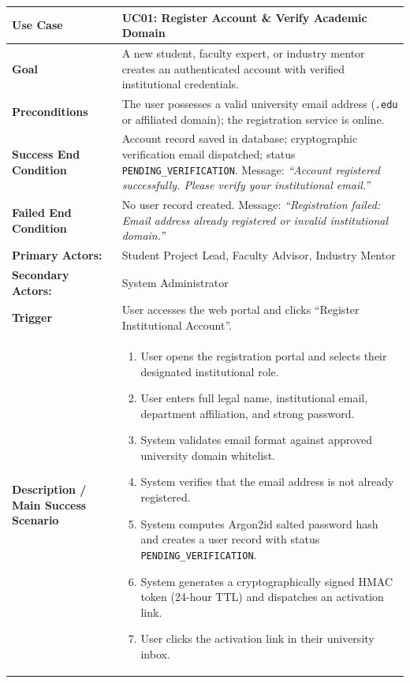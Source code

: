 \begin{table}[H]
\centering
\footnotesize
\begin{tabularx}{\textwidth}{|l|X|}
\hline
\rowcolor{lightgray!40} \textbf{Use Case} & \textbf{UC01: Register Account \& Verify Academic Domain} \\ \hline
\textbf{Goal} & A new student, faculty expert, or industry mentor creates an authenticated account with verified institutional credentials. \\ \hline
\textbf{Preconditions} & The user possesses a valid university email address (\texttt{.edu} or affiliated domain); the registration service is online. \\ \hline
\textbf{Success End Condition} & Account record saved in database; cryptographic verification email dispatched; status \texttt{PENDING\_VERIFICATION}. Message: \textit{``Account registered successfully. Please verify your institutional email.''} \\ \hline
\textbf{Failed End Condition} & No user record created. Message: \textit{``Registration failed: Email address already registered or invalid institutional domain.''} \\ \hline
\textbf{Primary Actors:} & Student Project Lead, Faculty Advisor, Industry Mentor \\
\textbf{Secondary Actors:} & System Administrator \\ \hline
\textbf{Trigger} & User accesses the web portal and clicks ``Register Institutional Account''. \\ \hline
\textbf{Description / Main Success Scenario} &
\begin{enumerate}[leftmargin=*, nosep]
    \item User opens the registration portal and selects their designated institutional role.
    \item User enters full legal name, institutional email, department affiliation, and strong password.
    \item System validates email format against approved university domain whitelist.
    \item System verifies that the email address is not already registered.
    \item System computes Argon2id salted password hash and creates a user record with status \texttt{PENDING\_VERIFICATION}.
    \item System generates a cryptographically signed HMAC token (24-hour TTL) and dispatches an activation link.
    \item User clicks the activation link in their university inbox.

\end{enumerate}
\end{tabularx}
\end{table}
